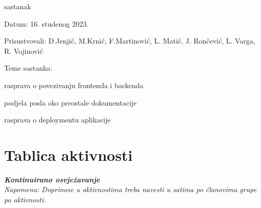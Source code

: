 \begin{packed_enum}
			
			\item  sastanak
			\item[] \begin{packed_item}
				\item Datum: 16. studenog 2023.
				\item Prisustvovali: D.Jenjić, M.Krnić, F.Martinović, L. Matić, J. Rončević, L. Varga, R. Vojinović
				\item Teme sastanka:
				\begin{packed_item}
					\item  rasprava o povezivanju frontenda i backenda
					\item  podjela posla oko preostale dokumentacije
					\item  rasprava o deploymentu aplikacije
				\end{packed_item}
			\end{packed_item}
			
			
			

			
		\end{packed_enum}
		
		\eject
		\section*{Tablica aktivnosti}
		
			\textbf{\textit{Kontinuirano osvježavanje}}\\
			
			 \textit{Napomena: Doprinose u aktivnostima treba navesti u satima po članovima grupe po aktivnosti.}

